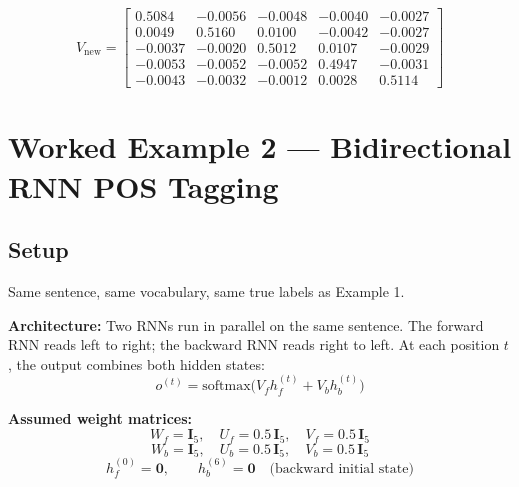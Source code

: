 \begin{equation}
    V_{\text{new}} = \begin{bmatrix}
     0.5084 & -0.0056 & -0.0048 & -0.0040 & -0.0027 \\
     0.0049 &  0.5160 &  0.0100 & -0.0042 & -0.0027 \\
    -0.0037 & -0.0020 &  0.5012 &  0.0107 & -0.0029 \\
    -0.0053 & -0.0052 & -0.0052 &  0.4947 & -0.0031 \\
    -0.0043 & -0.0032 & -0.0012 &  0.0028 &  0.5114
    \end{bmatrix}
\end{equation}

\section{Worked Example 2 --- Bidirectional RNN POS Tagging}

\subsection{Setup}

Same sentence, same vocabulary, same true labels as Example 1.

\textbf{Architecture:} Two RNNs run in parallel on the same sentence. The forward RNN reads
left to right; the backward RNN reads right to left. At each position $t$, the output
combines both hidden states:
\begin{equation}
    o^{(t)} = \text{softmax}\!\bigl(V_f h_f^{(t)} + V_b h_b^{(t)}\bigr)
\end{equation}

\textbf{Assumed weight matrices:}
\begin{equation}
    W_f = \mathbf{I}_5, \quad U_f = 0.5\,\mathbf{I}_5, \quad V_f = 0.5\,\mathbf{I}_5
\end{equation}
\begin{equation}
    W_b = \mathbf{I}_5, \quad U_b = 0.5\,\mathbf{I}_5, \quad V_b = 0.5\,\mathbf{I}_5
\end{equation}
\begin{equation}
    h_f^{(0)} = \mathbf{0}, \qquad h_b^{(6)} = \mathbf{0} \quad \text{(backward initial state)}
\end{equation}

